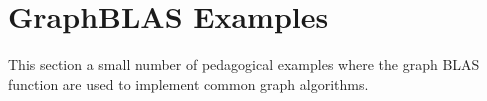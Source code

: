 %



\chapter{GraphBLAS Examples}
\label{chap:GraphBLAS Examples}
\label{chap:Appendix A}
This section a small number of pedagogical examples where the graph BLAS function are used 
to implement common graph algorithms.




